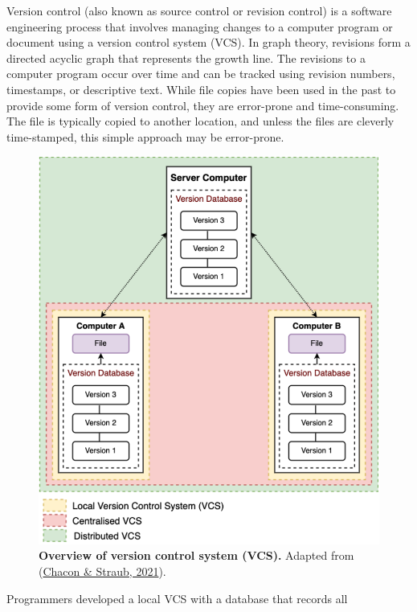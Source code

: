 \documentclass[12pt,twoside]{reedthesis}
\begin{document}
Version control (also known as source control or revision control) is a
software engineering process that involves managing changes to a
computer program or document using a version control system (VCS). In
graph theory, revisions form a directed acyclic graph that represents
the growth line. The revisions to a computer program occur over time and
can be tracked using revision numbers, timestamps, or descriptive text.
While file copies have been used in the past to provide some form of
version control, they are error-prone and time-consuming. The file is
typically copied to another location, and unless the files are cleverly
time-stamped, this simple approach may be error-prone.


\begin{figure}[H]

{\centering \includegraphics{thesis_files/figure-latex/mf1-1} 

}

\caption[Overview of version control system]{\textbf{Overview of version control system (VCS).} Adapted from (\protect\hyperlink{ref-chacon2021}{Chacon \& Straub, 2021}).}\label{fig:mf1}
\end{figure}
Programmers developed a local VCS with a database that records all
\end{document}
